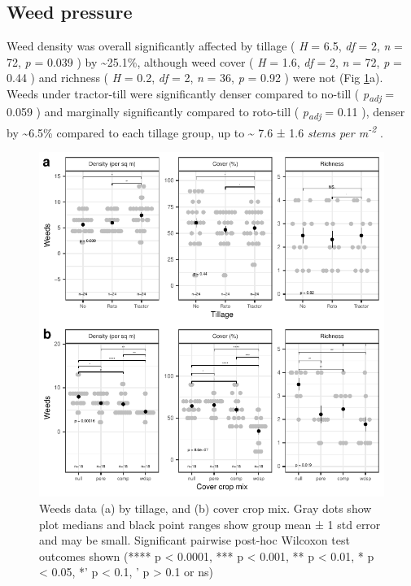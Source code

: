 \documentclass[
  12pt,
]{article}
\begin{document}
\hypertarget{weed-pressure}{%
\subsection{Weed pressure}\label{weed-pressure}}

Weed density was overall significantly affected by tillage (
\emph{H} = 6.5,
\emph{df} = 2,
\emph{n} = 72,
\emph{p} = 0.039
) by
\textasciitilde25.1\%,
although weed cover (
\emph{H} = 1.6,
\emph{df} = 2,
\emph{n} = 72,
\emph{p} = 0.44
) and richness (
\emph{H} = 0.2,
\emph{df} = 2,
\emph{n} = 36,
\emph{p} = 0.92
) were not
(Fig \ref{fig:weedsFig}a).
Weeds under tractor-till were significantly denser compared to no-till (
\emph{p\textsubscript{adj}} = 0.059
) and marginally significantly compared to roto-till (
\emph{p\textsubscript{adj}} = 0.11
), denser by
\textasciitilde6.5\%
compared to each tillage group,
up to
\textasciitilde{} 7.6 ±
1.6 \emph{stems per m\textsuperscript{-2}}
.

\begin{figure}
\centering
\includegraphics{merge_files/figure-latex/weedsFig-1.pdf}
\caption{\label{fig:weedsFig}Weeds data (a) by tillage, and (b) cover crop mix. Gray dots show plot medians and black point ranges show group mean ± 1 std error and may be small. Significant pairwise post-hoc Wilcoxon test outcomes shown (**** p \textless{} 0.0001, *** p \textless{} 0.001, ** p \textless{} 0.01, * p \textless{} 0.05, *' p \textless{} 0.1, ' p \textgreater{} 0.1 or ns)}
\end{figure}
\end{document}
